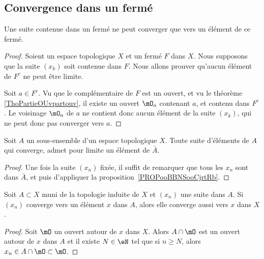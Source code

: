 \subsection{Convergence dans un fermé}

\begin{proposition}      \label{PROPooBBNSooCjrtRb}
    Une suite contenue dans un fermé ne peut converger que vers un élément de ce fermé.
\end{proposition}

\begin{proof}
    Soient un espace topologique \( X\) et un fermé \( F\) dans \( X\). Nous supposons que la suite \( (x_k)\) soit contenue dans \( F\). Nous allons prouver qu'aucun élément de \( F^c\) ne peut être limite.

    Soit \( a \in F^c\). Vu que le complémentaire de \( F\) est un ouvert, et vu le théorème \ref{ThoPartieOUvpartouv}, il existe un ouvert \( \mO_a\) contenant \( a\), et contenu dans \( F^c\). Le voisinage \( \mO_a\) de \( a\) ne contient donc aucun élément de la suite \( (x_k)\), qui ne peut donc pas converger vers \( a\).
\end{proof}

\begin{corollary}\label{CorLimAbarA}
  Soit \( A \) un sous-ensemble d'un espace topologique \(X \). Toute suite d'éléments de \(A \) qui converge, admet pour limite un élément de \( \bar A \).
\end{corollary}
\begin{proof}
  Une fois la suite \( (x_n) \) fixée, il suffit de remarquer que tous les \( x_n \) sont dans \( \bar A \), et puis d'appliquer la proposition~\ref{PROPooBBNSooCjrtRb}. 
\end{proof}


\begin{lemma}   \label{LemPESaiVw}
    Soit \( A\subset X\) muni de la topologie induite de \( X\) et \( (x_n)\) une suite dans \( A\). Si \( (x_n) \) converge vers un élément \( x \) dans \(A \), alors elle converge aussi vers \(x \) dans \( X \).
\end{lemma}

\begin{proof}
    Soit \( \mO\) un ouvert autour de \( x\) dans \( X\). Alors \( A\cap\mO\) est un ouvert autour de \( x\) dans \( A\) et il existe \( N\in \eN\) tel que si \( n\geq N\), alors \( x_n\in A\cap\mO\subset\mO\).
\end{proof}

